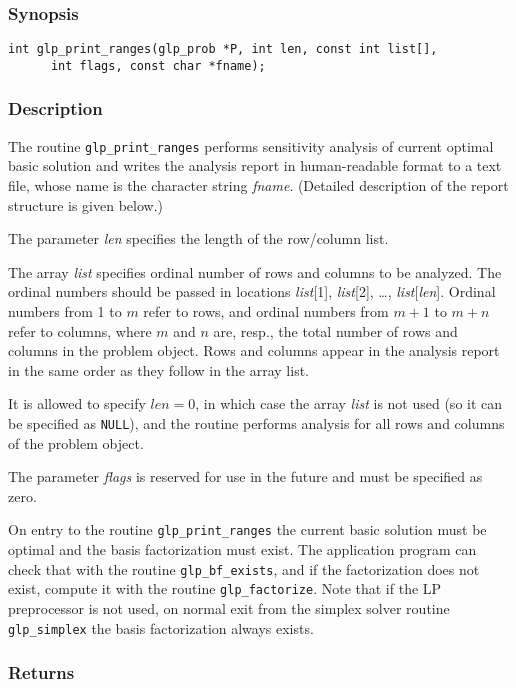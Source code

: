 \subsubsection*{Synopsis}

\begin{verbatim}
int glp_print_ranges(glp_prob *P, int len, const int list[],
      int flags, const char *fname);
\end{verbatim}

\subsubsection*{Description}

The routine \verb|glp_print_ranges| performs sensitivity analysis of
current optimal basic solution and writes the analysis report in
human-readable format to a text file, whose name is the character
string {\it fname}. (Detailed description of the report structure is
given below.)

The parameter {\it len} specifies the length of the row/column list.

The array {\it list} specifies ordinal number of rows and columns to be
analyzed. The ordinal numbers should be passed in locations
{\it list}[1], {\it list}[2], \dots, {\it list}[{\it len}]. Ordinal
numbers from 1 to $m$ refer to rows, and ordinal numbers from $m+1$ to
$m+n$ refer to columns, where $m$ and $n$ are, resp., the total number
of rows and columns in the problem object. Rows and columns appear in
the analysis report in the same order as they follow in the array list.

It is allowed to specify $len=0$, in which case the array {\it list} is
not used (so it can be specified as \verb|NULL|), and the routine
performs analysis for all rows and columns of the problem object.

The parameter {\it flags} is reserved for use in the future and must be
specified as zero.

On entry to the routine \verb|glp_print_ranges| the current basic
solution must be optimal and the basis factorization must exist.
The application program can check that with the routine
\verb|glp_bf_exists|, and if the factorization does
not exist, compute it with the routine \verb|glp_factorize|. Note that
if the LP preprocessor is not used, on normal exit from the simplex
solver routine \verb|glp_simplex| the basis factorization always exists.

\subsubsection*{Returns}


